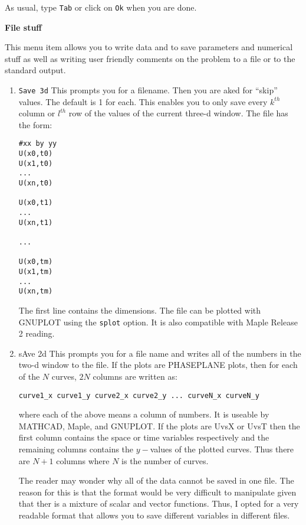 As usual, type {\tt Tab} or click on {\tt Ok} when you are done.
 
\vspace{.25 in}
\begin{center}
{\bf \large File stuff}
\end{center}
This menu item allows you to write data and to save parameters and
numerical stuff as well as writing user friendly comments on the
problem to a file or to the standard output.

\begin{enumerate}
\item {\tt Save 3d} This prompts you for a filename.  Then you are aked
for ``skip'' values.  The default is 1 for each.  This enables you to
only save every $k^{th}$ column or $l^{th}$ row of the
values of the current three-d window.  The file has the form:
\begin{verbatim}
#xx by yy
U(x0,t0)
U(x1,t0)
...
U(xn,t0)

U(x0,t1)
...
U(xn,t1)

...

U(x0,tm)
U(x1,tm)
...
U(xn,tm)
\end{verbatim}
The first line contains the dimensions.  The file can be plotted with
GNUPLOT using the {\tt splot} option.  It is also compatible with
Maple Release 2 reading.
\item {sAve 2d} This prompts you for a file name and writes all of the
numbers in the two-d window to the file.  If the plots are PHASEPLANE
plots, then for each of the $N$ curves, $2N$ columns are written as:
\begin{verbatim}
curve1_x curve1_y curve2_x curve2_y ... curveN_x curveN_y
\end{verbatim}
where each of the above means a column of numbers. It is useable by
MATHCAD, Maple, and GNUPLOT.
If the plots are UvsX or UvsT then the first column contains the space
or time variables respectively and the remaining columns contains the
$y-$values of the plotted curves.  Thus there are $N+1$ columns where
$N$ is the number of curves.  

The reader may wonder why all of the data cannot be saved in one file.
The reason for this is that the format would be very difficult to
manipulate given that ther is a mixture of scalar and vector
functions.  Thus, I opted for a very readable format that allows you
to save different variables in different files.


\end{enumerate}

